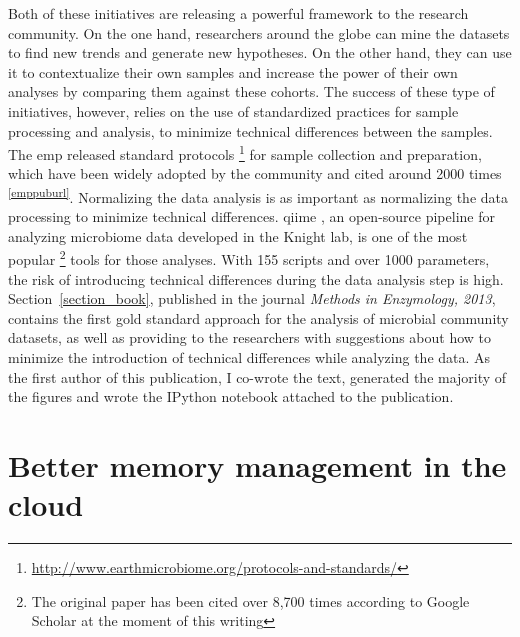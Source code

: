 \documentclass[12pt,chapterheads]{ucsd}
\begin{document}
Both of these initiatives are releasing a powerful framework to the research
community. On the one hand, researchers around the globe can mine the datasets to
find new trends and generate new hypotheses. On the other hand, they can use
it to contextualize their own samples and increase the power of their own analyses
by comparing them against these cohorts. The success of these type of initiatives,
however, relies on the use of standardized practices for sample processing and
analysis, to minimize technical differences between the samples. The \gls{emp}
released standard protocols \footnote{ \url{http://www.earthmicrobiome.org/protocols-and-standards/}}
for sample collection and preparation, which have been widely adopted by the community and cited
around 2000 times \textsuperscript{\ref{emppuburl}}. Normalizing the data
analysis is as important as normalizing the data processing to minimize
technical differences. %
\gls{qiime} \cite{Caporaso2010}, an open-source pipeline for analyzing microbiome
data developed in the Knight lab, is one of the most popular \footnote{The original paper
has been cited over 8,700 times according to Google Scholar at the moment of this writing}
tools for those analyses. With 155 scripts and over 1000
parameters, the risk of introducing technical differences during the data analysis
step is high. Section~\ref{section_book}, published in the journal
\textsl{Methods in Enzymology, 2013}, contains the first gold standard approach
for the analysis of microbial community datasets, as well as providing to the
researchers with suggestions about how to minimize the introduction of
technical differences while analyzing the data. As the first author of this
publication, I co-wrote the text, generated the majority of the figures and wrote
the IPython notebook \cite{Perez2007} attached to the publication.






\chapter{Better memory management in the cloud}\label{chapter_cudswap}
\glsresetall
\end{document}
